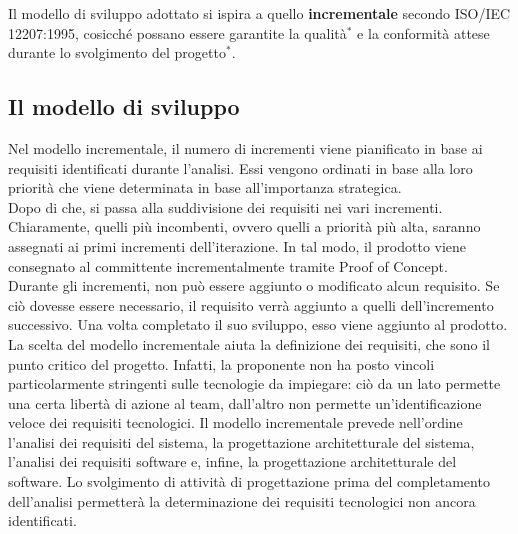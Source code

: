 Il modello di sviluppo adottato si ispira a quello \textbf{incrementale} secondo ISO/IEC 12207:1995, cosicché possano essere garantite la qualità$^*$ e la conformità attese durante lo svolgimento del progetto$^*$.

\subsection{Il modello di sviluppo}
Nel modello incrementale, il numero di incrementi viene pianificato in base ai requisiti identificati durante l'analisi. Essi vengono ordinati in base alla loro priorità che viene determinata in base all'importanza strategica.\\
Dopo di che, si passa alla suddivisione dei requisiti nei vari incrementi. Chiaramente, quelli più incombenti, ovvero quelli a priorità più alta, saranno assegnati ai primi incrementi dell'iterazione. In tal modo, il prodotto viene consegnato al committente incrementalmente tramite Proof of Concept.\\
Durante gli incrementi, non può essere aggiunto o modificato alcun requisito. Se ciò dovesse essere necessario, il requisito verrà aggiunto a quelli dell'incremento successivo. Una volta completato il suo sviluppo, esso viene aggiunto al prodotto.\\
La scelta del modello incrementale aiuta la definizione dei requisiti, che sono il punto critico del progetto. Infatti, la proponente non ha posto vincoli particolarmente stringenti sulle tecnologie da impiegare: ciò da un lato permette una certa libertà di azione al team, dall'altro non permette un'identificazione veloce dei requisiti tecnologici. Il modello incrementale prevede nell'ordine l'analisi dei requisiti del sistema, la progettazione architetturale del sistema, l'analisi dei requisiti software e, infine, la progettazione architetturale del software. Lo svolgimento di attività di progettazione prima del completamento dell'analisi permetterà la determinazione dei requisiti tecnologici non ancora identificati.

